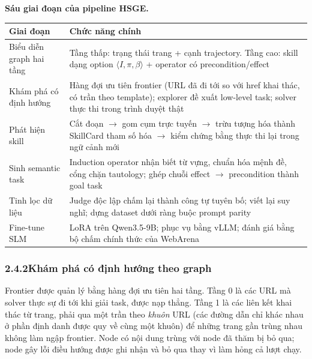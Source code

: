 \begin{center}
\begin{minipage}{\textwidth}
\centering
\textbf{Sáu giai đoạn của pipeline HSGE.}
\vspace{0.6em}

\small
\begin{tabular}{@{}L{3.6cm} L{9.2cm}@{}}
\toprule
\textbf{Giai đoạn} & \textbf{Chức năng chính} \\
\midrule
Biểu diễn graph hai tầng & Tầng thấp: trạng thái trang + cạnh trajectory.
Tầng cao: skill dạng option $\langle I, \pi, \beta \rangle$ + operator có
precondition/effect \\
\addlinespace
Khám phá có định hướng & Hàng đợi ưu tiên frontier (URL đã đi tới so với href
khai thác, có trần theo template); explorer đề xuất low-level task; solver
thực thi trong trình duyệt thật \\
\addlinespace
Phát hiện skill & Cắt đoạn $\rightarrow$ gom cụm trực tuyến $\rightarrow$
trừu tượng hóa thành SkillCard tham số hóa $\rightarrow$ kiểm chứng bằng thực
thi lại trong ngữ cảnh mới \\
\addlinespace
Sinh semantic task & Induction operator nhận biết từ vựng, chuẩn hóa mệnh đề,
cổng chặn tautology; ghép chuỗi effect $\rightarrow$ precondition thành goal
task \\
\addlinespace
Tinh lọc dữ liệu & Judge độc lập chấm lại thành công tự tuyên bố; viết lại suy
nghĩ; dựng dataset dưới ràng buộc prompt parity \\
\addlinespace
Fine-tune SLM & LoRA trên Qwen3.5-9B; phục vụ bằng vLLM; đánh giá bằng bộ chấm
chính thức của WebArena \\
\bottomrule
\end{tabular}
\end{minipage}
\end{center}

\subsubsection*{2.4.2\quad Khám phá có định hướng theo graph}

Frontier được quản lý bằng hàng đợi ưu tiên hai tầng. Tầng 0 là các URL mà
solver thực sự đi tới khi giải task, được nạp thẳng. Tầng 1 là các liên kết
khai thác từ trang, phải qua một trần theo \emph{khuôn} URL (các đường dẫn
chỉ khác nhau ở phần định danh được quy về cùng một khuôn) để những trang
gần trùng nhau không làm ngập frontier. Node có nội dung trùng với node đã
thăm bị bỏ qua; node gây lỗi điều hướng được ghi nhận và bỏ qua thay vì làm
hỏng cả lượt chạy.

